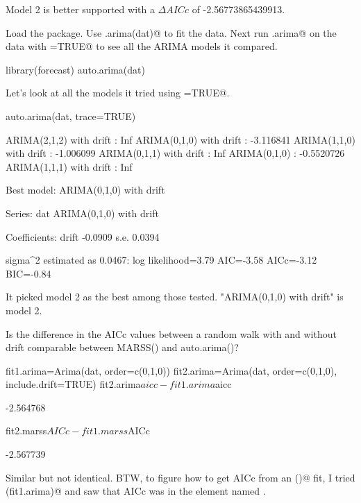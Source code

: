 \begin{wideenumerate}
\begin{Schunk}
\begin{Soutput}
\end{Soutput}
\end{Schunk}
Model 2 is better supported with a $\Delta AICc$ of -2.56773865439913.
\item Load the \verb@forecast@ package. Use \verb@auto.arima(dat)@  to fit the data.  Next run \verb@auto.arima@ on the data with \verb@trace=TRUE@ to see all the ARIMA models it compared. 
\begin{Schunk}
\begin{Sinput}
 library(forecast)
 auto.arima(dat)
\end{Sinput}
\end{Schunk}
Let's look at all the models it tried using \verb@trace=TRUE@.
\begin{Schunk}
\begin{Sinput}
 auto.arima(dat, trace=TRUE)
\end{Sinput}
\begin{Soutput}
 ARIMA(2,1,2) with drift         : Inf
 ARIMA(0,1,0) with drift         : -3.116841
 ARIMA(1,1,0) with drift         : -1.006099
 ARIMA(0,1,1) with drift         : Inf
 ARIMA(0,1,0)                    : -0.5520726
 ARIMA(1,1,1) with drift         : Inf

 Best model: ARIMA(0,1,0) with drift         

Series: dat 
ARIMA(0,1,0) with drift         

Coefficients:
        drift
      -0.0909
s.e.   0.0394

sigma^2 estimated as 0.0467:  log likelihood=3.79
AIC=-3.58   AICc=-3.12   BIC=-0.84
\end{Soutput}
\end{Schunk}
It picked model 2 as the best among those tested.  "ARIMA(0,1,0) with drift" is model 2.  

\item Is the difference in the AICc values between a random walk with and without drift comparable between MARSS() and auto.arima()?
\begin{Schunk}
\begin{Sinput}
 fit1.arima=Arima(dat, order=c(0,1,0))
 fit2.arima=Arima(dat, order=c(0,1,0), include.drift=TRUE)
 fit2.arima$aicc-fit1.arima$aicc
\end{Sinput}
\begin{Soutput}
[1] -2.564768
\end{Soutput}
\begin{Sinput}
 fit2.marss$AICc-fit1.marss$AICc
\end{Sinput}
\begin{Soutput}
[1] -2.567739
\end{Soutput}
\end{Schunk}
Similar but not identical.  BTW, to figure how to get AICc from an \verb@Arima()@ fit, I tried \verb@names(fit1.arima)@ and saw that AICc was in the element named \verb@aicc@.
\end{wideenumerate}

